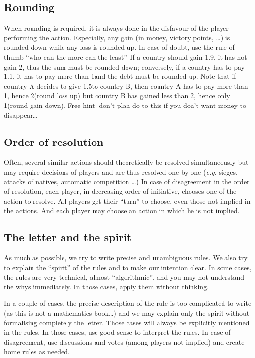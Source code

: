 \subsection{Rounding}

\aparag When rounding is required, it is always done in the disfavour of the
player performing the action.
\bparag Especially, any gain (in money, victory points, \ldots) is rounded
down while any loss is rounded up.
\bparag In case of doubt, use the rule of thumb ``who can the more can the
least''. If a country should gain 1.9\ducats, it has not gain 2\ducats, thus
the sum must be rounded down; conversely, if a country has to pay 1.1\ducats,
it has to pay more than 1\ducats and the debt must be rounded up.
\bparag Note that if country A decides to give 1.5\ducats to country B, then
country A has to pay more than 1\ducats, hence 2\ducats (round loss up) but
country B has gained less than 2\ducats, hence only 1\ducats (round gain
down). Free hint: don't plan do to this if you don't want money to
disappear\ldots

\subsection{Order of resolution}
\aparag Often, several similar actions should theoretically be resolved
simultaneously but may require decisions of players and are thus resolved one
by one (\emph{e.g.} sieges, attacks of natives, automatic competition \ldots)
\bparag In case of disagreement in the order of resolution, each player, in
decreasing order of initiative, chooses one of the action to resolve.
\bparag All players get their ``turn'' to choose, even those not implied in
the actions. And each player may choose an action in which he is not implied.

\subsection{The letter and the spirit}
\aparag As much as possible, we try to write precise and unambiguous rules. We
also try to explain the ``spirit'' of the rules and to make our intention
clear.
\bparag In some cases, the rules are very technical, almost ``algorithmic'',
and you may not understand the whys immediately. In those cases, apply them
without thinking.

\aparag In a couple of cases, the precise description of the rule is too
complicated to write (as this is not a mathematics book\ldots) and we may
explain only the spirit without formalising completely the letter. Those cases
will always be explicitly mentioned in the rules.
\bparag In those cases, use good sense to interpret the rules. In case of
disagreement, use discussions and votes (among players not implied) and create
home rules as needed.

